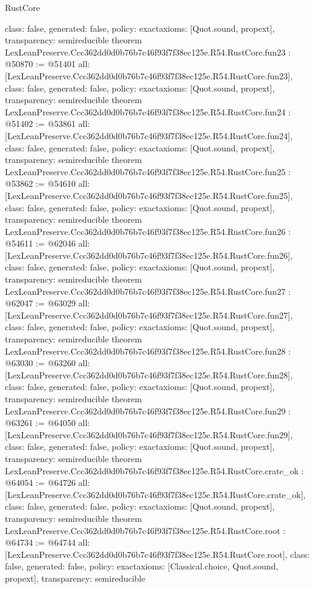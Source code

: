 \begin{lexlean}{RustCore}
\begin{coremodule}
{  class: false,
  generated: false,
  policy: exact{axioms: [Quot.sound, propext]},
  transparency: semireducible
}
theorem LexLeanPreserve.Ccc362dd0d0b76b7c46f93f7f38ec125e.R54.RustCore.fun23 : @50870 := @51401 {
  all: [LexLeanPreserve.Ccc362dd0d0b76b7c46f93f7f38ec125e.R54.RustCore.fun23],
  class: false,
  generated: false,
  policy: exact{axioms: [Quot.sound, propext]},
  transparency: semireducible
}
theorem LexLeanPreserve.Ccc362dd0d0b76b7c46f93f7f38ec125e.R54.RustCore.fun24 : @51402 := @53861 {
  all: [LexLeanPreserve.Ccc362dd0d0b76b7c46f93f7f38ec125e.R54.RustCore.fun24],
  class: false,
  generated: false,
  policy: exact{axioms: [Quot.sound, propext]},
  transparency: semireducible
}
theorem LexLeanPreserve.Ccc362dd0d0b76b7c46f93f7f38ec125e.R54.RustCore.fun25 : @53862 := @54610 {
  all: [LexLeanPreserve.Ccc362dd0d0b76b7c46f93f7f38ec125e.R54.RustCore.fun25],
  class: false,
  generated: false,
  policy: exact{axioms: [Quot.sound, propext]},
  transparency: semireducible
}
theorem LexLeanPreserve.Ccc362dd0d0b76b7c46f93f7f38ec125e.R54.RustCore.fun26 : @54611 := @62046 {
  all: [LexLeanPreserve.Ccc362dd0d0b76b7c46f93f7f38ec125e.R54.RustCore.fun26],
  class: false,
  generated: false,
  policy: exact{axioms: [Quot.sound, propext]},
  transparency: semireducible
}
theorem LexLeanPreserve.Ccc362dd0d0b76b7c46f93f7f38ec125e.R54.RustCore.fun27 : @62047 := @63029 {
  all: [LexLeanPreserve.Ccc362dd0d0b76b7c46f93f7f38ec125e.R54.RustCore.fun27],
  class: false,
  generated: false,
  policy: exact{axioms: [Quot.sound, propext]},
  transparency: semireducible
}
theorem LexLeanPreserve.Ccc362dd0d0b76b7c46f93f7f38ec125e.R54.RustCore.fun28 : @63030 := @63260 {
  all: [LexLeanPreserve.Ccc362dd0d0b76b7c46f93f7f38ec125e.R54.RustCore.fun28],
  class: false,
  generated: false,
  policy: exact{axioms: [Quot.sound, propext]},
  transparency: semireducible
}
theorem LexLeanPreserve.Ccc362dd0d0b76b7c46f93f7f38ec125e.R54.RustCore.fun29 : @63261 := @64050 {
  all: [LexLeanPreserve.Ccc362dd0d0b76b7c46f93f7f38ec125e.R54.RustCore.fun29],
  class: false,
  generated: false,
  policy: exact{axioms: [Quot.sound, propext]},
  transparency: semireducible
}
theorem LexLeanPreserve.Ccc362dd0d0b76b7c46f93f7f38ec125e.R54.RustCore.crate_ok : @64054 := @64726 {
  all: [LexLeanPreserve.Ccc362dd0d0b76b7c46f93f7f38ec125e.R54.RustCore.crate_ok],
  class: false,
  generated: false,
  policy: exact{axioms: [Quot.sound, propext]},
  transparency: semireducible
}
theorem LexLeanPreserve.Ccc362dd0d0b76b7c46f93f7f38ec125e.R54.RustCore.root : @64734 := @64744 {
  all: [LexLeanPreserve.Ccc362dd0d0b76b7c46f93f7f38ec125e.R54.RustCore.root],
  class: false,
  generated: false,
  policy: exact{axioms: [Classical.choice, Quot.sound, propext]},
  transparency: semireducible
}


\end{coremodule}
\end{lexlean}
